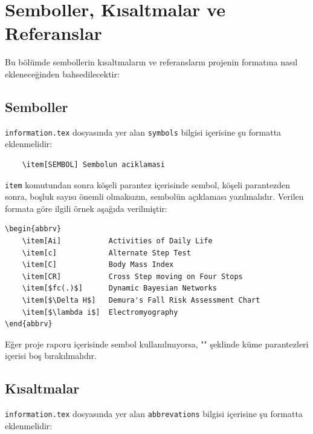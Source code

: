 \chapter{Semboller, Kısaltmalar ve Referanslar}

Bu bölümde sembollerin kısaltmaların ve referansların projenin \latex formatına nasıl ekleneceğinden bahsedilecektir:

\section{Semboller}
\texttt{information.tex} dosyasında yer alan \texttt{symbols} bilgisi içerisine şu formatta eklenmelidir: 

\begin{verbatim}
    \item[SEMBOL] Sembolun aciklamasi
\end{verbatim}

\texttt{item} komutundan sonra köşeli parantez içerisinde sembol, köşeli parantezden sonra, boşluk sayısı önemli olmaksızın, sembolün açıklaması yazılmalıdır. Verilen formata göre ilgili örnek aşağıda verilmiştir:

\begin{verbatim}
\begin{abbrv}
    \item[Ai]           Activities of Daily Life
    \item[c]            Alternate Step Test
    \item[C]            Body Mass Index
    \item[CR]           Cross Step moving on Four Stops
    \item[$fc(.)$]      Dynamic Bayesian Networks
    \item[$\Delta H$]   Demura's Fall Risk Assessment Chart
    \item[$\lambda i$]  Electromyography
\end{abbrv}
\end{verbatim}

Eğer proje raporu içerisinde sembol kullanılmıyorsa, "\texttt{\def\symbols{}}" şeklinde küme parantezleri içerisi boş bırakılmalıdır.

\section{Kısaltmalar}
\texttt{information.tex} dosyasında yer alan \texttt{abbrevations} bilgisi içerisine şu formatta eklenmelidir: 

